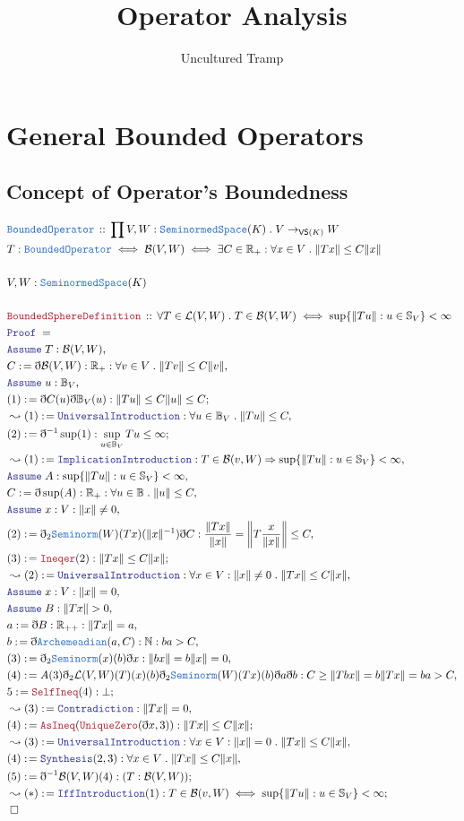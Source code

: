 \documentclass[12pt]{scrartcl}
\author{Uncultured Tramp}
\title{Operator Analysis}
\newcommand{\TYPE}[1]{\textcolor{NavyBlue}{\mathtt{#1}}}
\newcommand{\LOGIC}[1]{\textcolor{Blue}{\mathtt{#1}}}
\newcommand{\THM}[1]{\textcolor{Maroon}{\mathtt{#1}}}
\renewcommand{\.}{\; . \;}
\newcommand{\de}{: \kern 0.1pc =}
\newcommand{\Theorem}[2]{& \THM{#1} \, :: \, #2 \\ & \Proof = \\ }
\newcommand{\DeclareType}[2]{& \TYPE{#1} \, :: \, #2 \\}
\newcommand{\DefineNamedType}[4]{& #1 : \TYPE{#2} \iff #3 \iff #4 \\}
\newcommand{\Page}[1]{\begin{align*} #1 \end{align*} \newpage   }
\newcommand{ \bd }{ \ByDef }
\newcommand{\Reals}{\mathbb{R} }
\newcommand{\Nat}{\mathbb{N} }
\newcommand{\Say}[3]{& #1 \de #2 : #3, \\}
\newcommand{\Conclude}[3]{& #1 \de #2 : #3; \\}
\newcommand{\Derive}[3]{& \leadsto #1 \de #2 : #3, \\}
\newcommand{\DeriveConclude}[3]{& \leadsto #1 \de #2 : #3 ; \\}
\newcommand{\A}{\LOGIC{Assume} \;}
\newcommand{\Assume}[2]{& \A #1 : #2, \\}
\newcommand{\QED}{\; \square}
\newcommand{\EndProof}{& \QED \\}
\newcommand{\ByDef}{\eth}
\newcommand{\Proof}{\LOGIC{Proof} \; }
\newcommand{\SNS}{\TYPE{SeminormedSpace}} %
\renewcommand{\O}{\Omega}
\newcommand{\B}{\mathcal{B}}
\begin{document}
\maketitle
\begin{center}
\vspace*{\fill}
	\resizebox{\linewidth}{!}{ \itshape $Tf(x) = \int_\O  f(y)K(x,y) \, \mu\big(\mathrm{d}y\big)$}
\vspace*{\fill}
\end{center}
\newpage
\tableofcontents
\newpage
\section{General Bounded Operators}
\subsection{Concept of Operator's Boundedness}
\Page{
\DeclareType{BoundedOperator}{ \prod V,W : \SNS(K) \. V \to_{\mathsf{VS}(K)} W}
\DefineNamedType{T}{BoundedOperator}{ \B(V,W) }{ \exists C  \in \Reals_+ : \forall x \in V \. 
\| Tx \| \le C\| x \|}
\\ 
& V,W : \SNS(K) \\ \\
\Theorem{BoundedSphereDefinition}{ 
\forall T \in \mathcal{L}(V,W) \.  T \in \B(V,W) \iff \sup \{  \| Tu \| : u \in \mathbb{S}_V    \} < 
\infty 
}
\Assume{T}{\B(V,W)}
\Say{C}{\bd \B(V,W) }{\Reals_+ : \forall v \in V \. \| Tv \| \le C \| v \|}
\Assume{u }{ \mathbb{B}_V}
\Conclude{(1)}{ \bd C ( u ) \bd \mathbb{B}_V(u) }{ \| Tu \| \le C \| u \| \le C }
\Derive{(1)}{\LOGIC{UniversalIntroduction}}{\forall u \in \mathbb{B}_V \.  \| Tu \| \le C}
\Conclude{(2)}{ \bd^{-1} \sup (1)}{ \sup_{u \in \mathbb{B}_V} Tu \le \infty }
\Derive{(1)}{ \LOGIC{ImplicationIntroduction}}{  T \in \B(v,W) \Rightarrow \sup \{  \| Tu \| : u \in \mathbb{S}_V    \} < \infty  }
\Assume{A}{  \sup \{  \| Tu \| : u \in \mathbb{S}_V    \} < \infty }
\Say{C}{ \bd \sup (A)  }{\Reals_+ : \forall u \in \mathbb{B} \. \| u \| \le C}
\Assume{x }{ V : \|x\| \neq 0 }
\Say{(2)}{ \bd_2 \TYPE{Seminorm}(W)(Tx)(\| x\|^{-1})\bd C 
}{  \frac{ \| T x \| }{\| x \|} = \left \|  T\frac{x}{\| x \|} \right \| \le C   }
\Conclude{(3)}{ \THM{Ineqer}(2) }{ \| T x \| \le C \| x \|  }
\Derive{(2)}{\LOGIC{UniversalIntroduction}}
{  \forall x \in V : \| x \| \neq 0 \. \| T x \| \le C\|x\|}  
\Assume{x}{V : \|x\| = 0}
\Assume{B}{ \|Tx \| > 0 }
\Say{a}{ \bd B}{ \Reals_{++} : \| Tx \| = a }
\Say{b}{ \bd \TYPE{Archemeadian}(a,C) }{ \Nat : ba > C }
\Say{(3)}{ \bd_2 \TYPE{Seminorm}(x)(b) \bd x  }{ \| b x \| =  b \| x \| = 0  }
\Say{(4)}{ A(3)\bd_2 \mathcal{L}(V,W)(T)(x)(b) \bd_2 \TYPE{Seminorm}(W)(Tx)(b)\bd a \bd b }
{ C \ge \| Tbx \| = b\|Tx\| = ba > C }
\Conclude{5}{\THM{SelfIneq}(4)}{\bot}
\Derive{(3)}{\LOGIC{Contradiction}}{ \| Tx \| = 0 }
\Conclude{(4)}{ \THM{AsIneq}(\THM{UniqueZero}(\bd x, 3 )) }{ \| T x \| \le C\| x \| }
\Derive{(3)}{\LOGIC{UniversalIntroduction}}
{  \forall x \in V : \| x \| = 0 \. \| T x \| \le C\|x\|} 
\Say{(4)}{\LOGIC{Synthesis}(2,3)}{ \forall x \in V  \. \| Tx \| \le C\| x \|}
\Conclude{(5)}{ \bd^{-1} \B(V,W)(4)}{ (T : \B(V,W)) }
\DeriveConclude{(*)}{\LOGIC{IffIntroduction}(1)}{T \in \B(v,W) \iff \sup \{  \| Tu \| : u \in \mathbb{S}_V    \} < 
\infty }
\EndProof
} 
\end{document}
